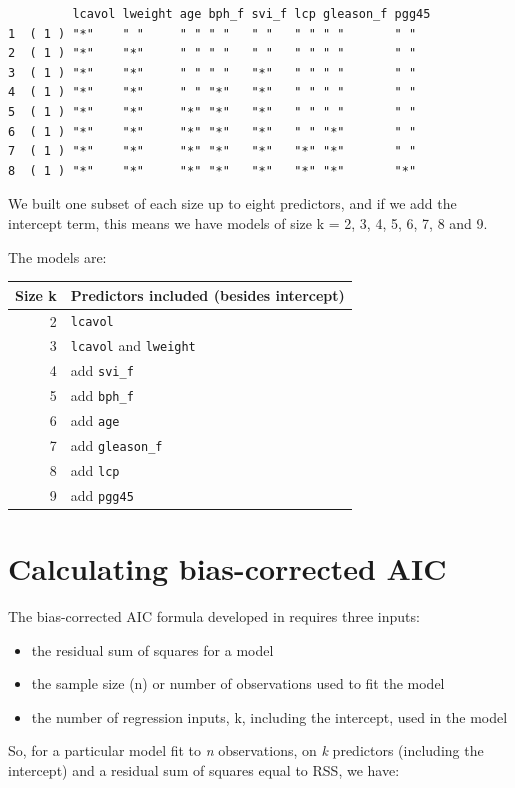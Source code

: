 \documentclass[]{book}
\providecommand{\tightlist}{%
  \setlength{\itemsep}{0pt}\setlength{\parskip}{0pt}}
\theoremstyle{definition}
\theoremstyle{definition}
\theoremstyle{definition}
\theoremstyle{remark}
\begin{document}
\begin{verbatim}
         lcavol lweight age bph_f svi_f lcp gleason_f pgg45
1  ( 1 ) "*"    " "     " " " "   " "   " " " "       " "  
2  ( 1 ) "*"    "*"     " " " "   " "   " " " "       " "  
3  ( 1 ) "*"    "*"     " " " "   "*"   " " " "       " "  
4  ( 1 ) "*"    "*"     " " "*"   "*"   " " " "       " "  
5  ( 1 ) "*"    "*"     "*" "*"   "*"   " " " "       " "  
6  ( 1 ) "*"    "*"     "*" "*"   "*"   " " "*"       " "  
7  ( 1 ) "*"    "*"     "*" "*"   "*"   "*" "*"       " "  
8  ( 1 ) "*"    "*"     "*" "*"   "*"   "*" "*"       "*"  
\end{verbatim}

We built one subset of each size up to eight predictors, and if we add
the intercept term, this means we have models of size k = 2, 3, 4, 5, 6,
7, 8 and 9.

The models are:

\begin{longtable}[]{@{}rl@{}}
\toprule
Size k & Predictors included (besides intercept)\tabularnewline
\midrule
\endhead
2 & \texttt{lcavol}\tabularnewline
3 & \texttt{lcavol} and \texttt{lweight}\tabularnewline
4 & add \texttt{svi\_f}\tabularnewline
5 & add \texttt{bph\_f}\tabularnewline
6 & add \texttt{age}\tabularnewline
7 & add \texttt{gleason\_f}\tabularnewline
8 & add \texttt{lcp}\tabularnewline
9 & add \texttt{pgg45}\tabularnewline
\bottomrule
\end{longtable}

\section{Calculating bias-corrected
AIC}\label{calculating-bias-corrected-aic}

The bias-corrected AIC formula developed in \citet{HurvichTsai1989}
requires three inputs:

\begin{itemize}
\tightlist
\item
  the residual sum of squares for a model
\item
  the sample size (n) or number of observations used to fit the model
\item
  the number of regression inputs, k, including the intercept, used in
  the model
\end{itemize}

So, for a particular model fit to \emph{n} observations, on \emph{k}
predictors (including the intercept) and a residual sum of squares equal
to RSS, we have:
\end{document}
